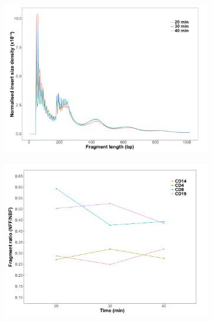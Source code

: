 \begin{figure}[htbp]
\centering
\begin{subfigure}{0.5\textwidth}
\centering
\includegraphics[width=\textwidth]{./Results1/pdfs/ATAC_CD8_fragment_size_distribution_20_30_40min}
\caption{\textbf{}}
\end{subfigure}%
\begin{subfigure}{0.5\textwidth}
\centering
\includegraphics[width=\textwidth]{./Results1/pdfs/ATAC_ratio_short_long_fragments_20_30_40_min}
\caption{\textbf{}}
\end{subfigure} \\
\begin{subfigure}{0.5\textwidth}

\end{subfigure}
\end{figure}
